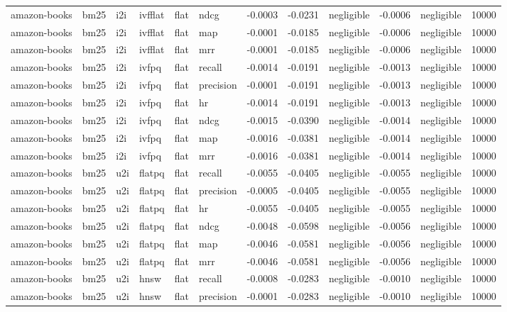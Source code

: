 \begin{tabular}{llllllrrlrlr}
amazon-books & bm25 & i2i & ivfflat & flat & ndcg & -0.0003 & -0.0231 & negligible & -0.0006 & negligible & 10000 \\
amazon-books & bm25 & i2i & ivfflat & flat & map & -0.0001 & -0.0185 & negligible & -0.0006 & negligible & 10000 \\
amazon-books & bm25 & i2i & ivfflat & flat & mrr & -0.0001 & -0.0185 & negligible & -0.0006 & negligible & 10000 \\
amazon-books & bm25 & i2i & ivfpq & flat & recall & -0.0014 & -0.0191 & negligible & -0.0013 & negligible & 10000 \\
amazon-books & bm25 & i2i & ivfpq & flat & precision & -0.0001 & -0.0191 & negligible & -0.0013 & negligible & 10000 \\
amazon-books & bm25 & i2i & ivfpq & flat & hr & -0.0014 & -0.0191 & negligible & -0.0013 & negligible & 10000 \\
amazon-books & bm25 & i2i & ivfpq & flat & ndcg & -0.0015 & -0.0390 & negligible & -0.0014 & negligible & 10000 \\
amazon-books & bm25 & i2i & ivfpq & flat & map & -0.0016 & -0.0381 & negligible & -0.0014 & negligible & 10000 \\
amazon-books & bm25 & i2i & ivfpq & flat & mrr & -0.0016 & -0.0381 & negligible & -0.0014 & negligible & 10000 \\
amazon-books & bm25 & u2i & flatpq & flat & recall & -0.0055 & -0.0405 & negligible & -0.0055 & negligible & 10000 \\
amazon-books & bm25 & u2i & flatpq & flat & precision & -0.0005 & -0.0405 & negligible & -0.0055 & negligible & 10000 \\
amazon-books & bm25 & u2i & flatpq & flat & hr & -0.0055 & -0.0405 & negligible & -0.0055 & negligible & 10000 \\
amazon-books & bm25 & u2i & flatpq & flat & ndcg & -0.0048 & -0.0598 & negligible & -0.0056 & negligible & 10000 \\
amazon-books & bm25 & u2i & flatpq & flat & map & -0.0046 & -0.0581 & negligible & -0.0056 & negligible & 10000 \\
amazon-books & bm25 & u2i & flatpq & flat & mrr & -0.0046 & -0.0581 & negligible & -0.0056 & negligible & 10000 \\
amazon-books & bm25 & u2i & hnsw & flat & recall & -0.0008 & -0.0283 & negligible & -0.0010 & negligible & 10000 \\
amazon-books & bm25 & u2i & hnsw & flat & precision & -0.0001 & -0.0283 & negligible & -0.0010 & negligible & 10000 \\

\end{tabular}
